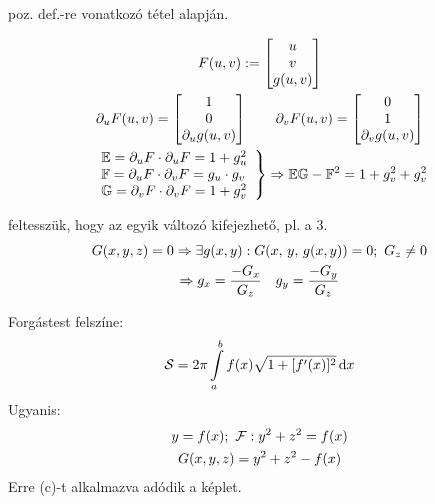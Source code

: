 \begin{biz}
  \begin{enumzjr}
  \item poz. def.-re vonatkozó tétel alapján.
  \item%
    \begin{gather*}
      F(u,v) := \begin{bmatrix} u\\ v \\ g(u,v) \end{bmatrix}\\
      \partial_uF(u,v) = \begin{bmatrix} 1\\ 0 \\ \partial_ug(u,v) \end{bmatrix}\qquad
      \partial_vF(u,v) = \begin{bmatrix} 0\\ 1 \\ \partial_vg(u,v) \end{bmatrix}\\
      \left.\begin{array}{l}\mathbb E = \partial_uF \cdot \partial_uF = 1 + g_u^2\\
      \mathbb F = \partial_uF \cdot \partial_vF = g_u \cdot g_v\\
      \mathbb G = \partial_vF \cdot \partial_vF = 1 + g_v^2\end{array}\right\}
      \Rightarrow \mathbb E\mathbb G-\mathbb F^2 = 1 +g_v^2 + g_v^2
    \end{gather*}
    \item feltesszük, hogy az egyik változó kifejezhető, pl. a 3.
      \begin{gather*}
	G(x,y,z) = 0 \Rightarrow \exists g(x,y) : G(x,\,y,\,g(x,y)) = 0 ;\  G_z\neq 0\\
	\Rightarrow g_x = \dfrac{-G_x}{G_z}\quad g_y = \dfrac{-G_y}{G_z}
      \end{gather*}      
  \end{enumzjr}
\end{biz}

\begin{megj}
  Forgástest felszíne:
  \[ \fel = 2\pi\Int_a^bf(x)\sqrt{1+[f'(x)]^2}\diff x\]
  Ugyanis: 
  \begin{gather*}
    y=f(x);\ \mathcal F : y^2 + z^2 =  f(x)\\
    G(x,y,z) = y^2 + z^2 - f(x)      
  \end{gather*}
  Erre (c)-t alkalmazva adódik a képlet.
\end{megj}


